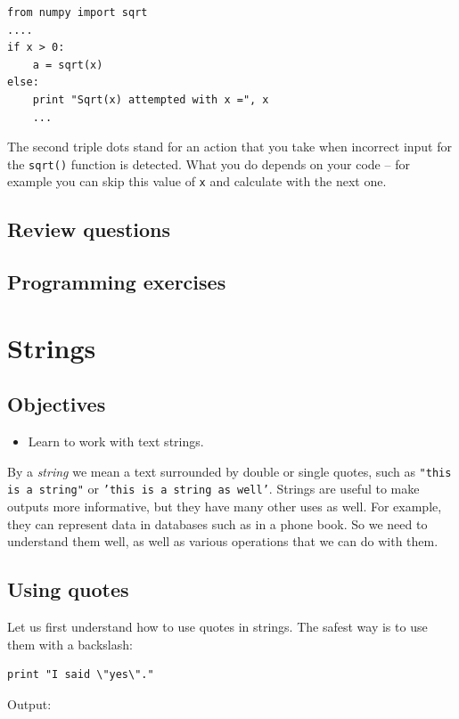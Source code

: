 \begin{verbatim}
from numpy import sqrt
....
if x > 0:
    a = sqrt(x)
else:
    print "Sqrt(x) attempted with x =", x
    ...
\end{verbatim}
The second triple dots stand for an action that you take when incorrect 
input for the {\tt sqrt()} function is detected. What you do depends on 
your code -- for example you can skip this value of {\tt x} and calculate 
with the next one. 

\subsection{Review questions}

\subsection{Programming exercises}

\section{Strings}

\subsection{Objectives}

\begin{itemize}
\item Learn to work with text strings.
\end{itemize}
By a {\em string} we mean a text surrounded by double or single quotes, such as 
{\tt "this is a string"} or {\tt 'this is a string as well'}.
Strings are useful to make outputs more informative, but 
they have many other uses as well. For example, they can represent data 
in databases such as in a phone book. So we need to understand them well,
as well as various operations that we can do with them.

\subsection{Using quotes}

Let us first understand how to use quotes in strings. The safest way is to use 
them with a backslash:

\begin{verbatim}
print "I said \"yes\"."
\end{verbatim}
Output:

